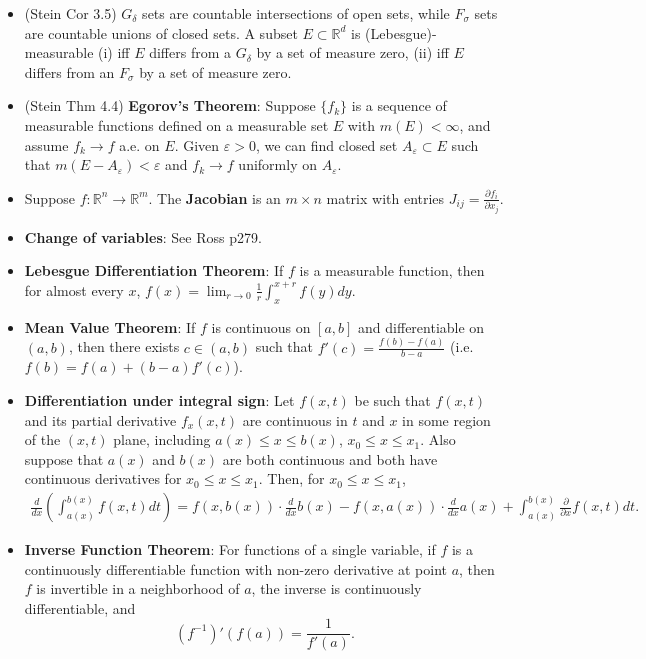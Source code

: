 \documentclass[twoside]{article}
\newcommand\bbR{\mathbb{R}}
\newcommand\dlt{\delta}
\def\eps{\varepsilon}
\newcommand\sg{\sigma}
\newcommand\goesto{\rightarrow}
\begin{document}
\begin{itemize}
\item (Stein Cor 3.5) $G_\dlt$ sets are countable intersections of open sets, while $F_\sg$ sets are countable unions of closed sets. A subset $E \subset \bbR^d$ is (Lebesgue)-measurable (i) iff $E$ differs from a $G_\dlt$ by a set of measure zero, (ii) iff $E$ differs from an $F_\sg$ by a set of measure zero.

\item (Stein Thm 4.4) \textbf{Egorov's Theorem}: Suppose $\{f_k \}$ is a sequence of measurable functions defined on a measurable set $E$ with $m(E) < \infty$, and assume $f_k \goesto f$ a.e. on $E$. Given $\eps > 0$, we can find closed set $A_\eps \subset E$ such that $m(E - A_\eps) < \eps$ and $f_k \goesto f$ uniformly on $A_\eps$.


\item Suppose $f: \bbR^n \goesto \bbR^m$. The \textbf{Jacobian} is an $m \times n$ matrix with entries $J_{ij} = \displaystyle\frac{\partial f_i}{\partial x_j}$.

\item \textbf{Change of variables}: See Ross p279.

\item \textbf{Lebesgue Differentiation Theorem}: If $f$ is a measurable function, then for almost every $x$, $f(x) = \displaystyle\lim_{r \goesto 0}\frac{1}{r}\int_x^{x+r} f(y)dy$.

\item \textbf{Mean Value Theorem}: If $f$ is continuous on $[a,b]$ and differentiable on $(a,b)$, then there exists $c \in (a,b)$ such that $f'(c) = \displaystyle\frac{f(b) - f(a)}{b-a}$ (i.e. $f(b) = f(a) + (b-a)f'(c)$).

\item \textbf{Differentiation under integral sign}: Let $f(x,t)$ be such that $f(x,t)$ and its partial derivative $f_x(x,t)$ are continuous in $t$ and $x$ in some region of the $(x,t)$ plane, including $a(x) \leq x \leq b(x)$, $x_0 \leq x \leq x_1$. Also suppose that $a(x)$ and $b(x)$ are both continuous and both have continuous derivatives for $x_0 \leq x \leq x_1$. Then, for $x_0 \leq x \leq x_1$,
\begin{align*}
\frac{d}{dx} \left(\int_{a(x)}^{b(x)} f(x,t) dt \right) = f(x, b(x))\cdot \frac{d}{dx}b(x) - f(x, a(x))\cdot \frac{d}{dx}a(x) + \int_{a(x)}^{b(x)} \frac{\partial}{\partial x} f(x, t) dt.
\end{align*}

\item \textbf{Inverse Function Theorem}: For functions of a single variable, if $f$ is a continuously differentiable function with non-zero derivative at point $a$, then $f$ is invertible in a neighborhood of $a$, the inverse is continuously differentiable, and
\begin{equation*}
(f^{-1})'(f(a)) = \frac{1}{f'(a)}.
\end{equation*}


\end{itemize}
\end{document}
